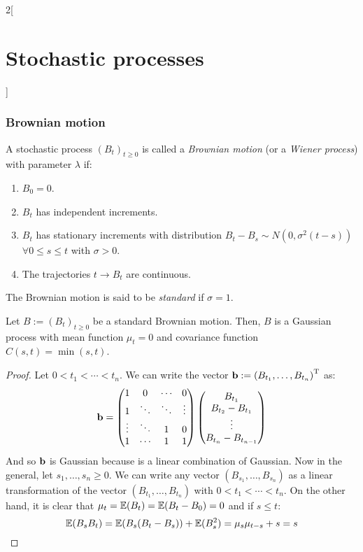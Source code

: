 \documentclass[../../../main_math.tex]{subfiles}
\begin{document}
\begin{multicols}{2}[\section{Stochastic processes}]
  \subsubsection{Brownian motion}
  \begin{definition}
    A stochastic process ${(B_t)}_{t\geq 0}$ is called a \emph{Brownian motion} (or a \emph{Wiener process}) with parameter $\lambda$ if:
    \begin{enumerate}
      \item $B_0=0$.
      \item $B_t$ has independent increments.
      \item $B_t$ has stationary increments with distribution $B_t-B_s\sim N(0,\sigma^2(t-s))$ $\forall 0\leq s\leq t$ with $\sigma>0$.
      \item The trajectories $t\to B_t$ are continuous.
    \end{enumerate}
    The Brownian motion is said to be \emph{standard} if $\sigma=1$.
  \end{definition}
  \begin{proposition}
    Let $B:={(B_t)}_{t\geq 0}$ be a standard Brownian motion. Then, $B$ is a Gaussian process with mean function $\mu_t=0$ and covariance function $C(s,t)=\min(s,t)$.
  \end{proposition}
  \begin{proof}
    Let $0< t_1<\cdots<t_n$. We can write the vector $\boldsymbol{\mathrm{b}}:={(B_{t_1},\ldots,B_{t_n})}^{\mathrm{T}}$ as:
    $$
      \boldsymbol{\mathrm{b}}=\begin{pmatrix}
        1      & 0      & \cdots & 0      \\
        1      & \ddots & \ddots & \vdots \\
        \vdots & \ddots & 1      & 0      \\
        1      & \cdots & 1      & 1
      \end{pmatrix}
      \begin{pmatrix}
        B_{t_1}           \\
        B_{t_2} - B_{t_1} \\
        \vdots            \\
        B_{t_n} - B_{t_{n-1}}
      \end{pmatrix}
    $$
    And so $\boldsymbol{\mathrm{b}}$ is Gaussian because is a linear combination of Gaussian. Now in the general, let $s_1, \ldots, s_n\geq 0$. We can write any vector $(B_{s_1}, \ldots, B_{s_n})$ as a linear transformation of the vector $(B_{t_1}, \ldots, B_{t_n})$ with $0< t_1<\cdots<t_n$. On the other hand, it is clear that $\mu_t=\mathbb{E}(B_t)=\mathbb{E}(B_t-B_0)=0$ and if $s\leq t$: $$\mathbb{E}(B_sB_t)=\mathbb{E}(B_s(B_t-B_s))+\mathbb{E}(B_s^2)=\mu_s\mu_{t-s}+s=s$$

\end{proof}
\end{multicols}
\end{document}
